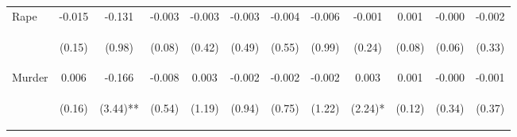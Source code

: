 \begin{tabular}{lccccccccccc}
\noalign{\smallskip}Rape & -0.015 & -0.131 & -0.003 & -0.003 & -0.003 & -0.004 & -0.006 & -0.001 & 0.001 & -0.000 & -0.002\\
 & \begin{footnotesize}(0.15)\end{footnotesize} & \begin{footnotesize}(0.98)\end{footnotesize} & \begin{footnotesize}(0.08)\end{footnotesize} & \begin{footnotesize}(0.42)\end{footnotesize} & \begin{footnotesize}(0.49)\end{footnotesize} & \begin{footnotesize}(0.55)\end{footnotesize} & \begin{footnotesize}(0.99)\end{footnotesize} & \begin{footnotesize}(0.24)\end{footnotesize} & \begin{footnotesize}(0.08)\end{footnotesize} & \begin{footnotesize}(0.06)\end{footnotesize} & \begin{footnotesize}(0.33)\end{footnotesize}\\
\noalign{\smallskip}Murder & 0.006 & -0.166 & -0.008 & 0.003 & -0.002 & -0.002 & -0.002 & 0.003 & 0.001 & -0.000 & -0.001\\
 & \begin{footnotesize}(0.16)\end{footnotesize} & \begin{footnotesize}(3.44)**\end{footnotesize} & \begin{footnotesize}(0.54)\end{footnotesize} & \begin{footnotesize}(1.19)\end{footnotesize} & \begin{footnotesize}(0.94)\end{footnotesize} & \begin{footnotesize}(0.75)\end{footnotesize} & \begin{footnotesize}(1.22)\end{footnotesize} & \begin{footnotesize}(2.24)*\end{footnotesize} & \begin{footnotesize}(0.12)\end{footnotesize} & \begin{footnotesize}(0.34)\end{footnotesize} & \begin{footnotesize}(0.37)\end{footnotesize}\\

\end{tabular}
